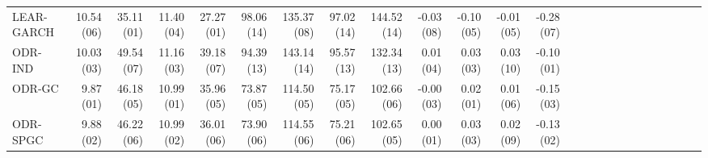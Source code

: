 \begin{tabular}{lrrrrrrrrrrrrrrrrrrrrrrrr}
LEAR-GARCH & {\cellcolor[HTML]{59A1CA}} \color[HTML]{F1F1F1} 10.54 (06) & {\cellcolor[HTML]{053061}} \color[HTML]{F1F1F1} 35.11 (01) & {\cellcolor[HTML]{266CAF}} \color[HTML]{F1F1F1} 11.40 (04) & {\cellcolor[HTML]{053061}} \color[HTML]{F1F1F1} 27.27 (01) & {\cellcolor[HTML]{BF3338}} \color[HTML]{F1F1F1} 98.06 (14) & {\cellcolor[HTML]{EDF2F5}} \color[HTML]{000000} 135.37 (08) & {\cellcolor[HTML]{D7634F}} \color[HTML]{F1F1F1} 97.02 (14) & {\cellcolor[HTML]{D05548}} \color[HTML]{F1F1F1} 144.52 (14) & {\cellcolor[HTML]{124984}} \color[HTML]{F1F1F1} -0.03 (08) & {\cellcolor[HTML]{246AAE}} \color[HTML]{F1F1F1} -0.10 (05) & {\cellcolor[HTML]{0A3B70}} \color[HTML]{F1F1F1} -0.01 (05) & {\cellcolor[HTML]{5FA5CD}} \color[HTML]{F1F1F1} -0.28 (07) \\
ODR-IND & {\cellcolor[HTML]{144E8A}} \color[HTML]{F1F1F1} 10.03 (03) & {\cellcolor[HTML]{CFE4EF}} \color[HTML]{000000} 49.54 (07) & {\cellcolor[HTML]{124984}} \color[HTML]{F1F1F1} 11.16 (03) & {\cellcolor[HTML]{D4E6F1}} \color[HTML]{000000} 39.18 (07) & {\cellcolor[HTML]{E27B62}} \color[HTML]{F1F1F1} 94.39 (13) & {\cellcolor[HTML]{FDD9C4}} \color[HTML]{000000} 143.14 (14) & {\cellcolor[HTML]{E37E64}} \color[HTML]{F1F1F1} 95.57 (13) & {\cellcolor[HTML]{FBCEB7}} \color[HTML]{000000} 132.34 (13) & {\cellcolor[HTML]{09386D}} \color[HTML]{F1F1F1} 0.01 (04) & {\cellcolor[HTML]{0A3B70}} \color[HTML]{F1F1F1} 0.03 (03) & {\cellcolor[HTML]{114781}} \color[HTML]{F1F1F1} 0.03 (10) & {\cellcolor[HTML]{053061}} \color[HTML]{F1F1F1} -0.10 (01) \\
ODR-GC & {\cellcolor[HTML]{053061}} \color[HTML]{F1F1F1} 9.87 (01) & {\cellcolor[HTML]{9BC9E0}} \color[HTML]{000000} 46.18 (05) & {\cellcolor[HTML]{053061}} \color[HTML]{F1F1F1} 10.99 (01) & {\cellcolor[HTML]{98C8E0}} \color[HTML]{000000} 35.96 (05) & {\cellcolor[HTML]{276EB0}} \color[HTML]{F1F1F1} 73.87 (05) & {\cellcolor[HTML]{1C5C9F}} \color[HTML]{F1F1F1} 114.50 (05) & {\cellcolor[HTML]{276EB0}} \color[HTML]{F1F1F1} 75.17 (05) & {\cellcolor[HTML]{195696}} \color[HTML]{F1F1F1} 102.66 (06) & {\cellcolor[HTML]{063264}} \color[HTML]{F1F1F1} -0.00 (03) & {\cellcolor[HTML]{053061}} \color[HTML]{F1F1F1} 0.02 (01) & {\cellcolor[HTML]{0A3B70}} \color[HTML]{F1F1F1} 0.01 (06) & {\cellcolor[HTML]{144E8A}} \color[HTML]{F1F1F1} -0.15 (03) \\
ODR-SPGC & {\cellcolor[HTML]{053061}} \color[HTML]{F1F1F1} 9.88 (02) & {\cellcolor[HTML]{9DCBE1}} \color[HTML]{000000} 46.22 (06) & {\cellcolor[HTML]{053061}} \color[HTML]{F1F1F1} 10.99 (02) & {\cellcolor[HTML]{98C8E0}} \color[HTML]{000000} 36.01 (06) & {\cellcolor[HTML]{276EB0}} \color[HTML]{F1F1F1} 73.90 (06) & {\cellcolor[HTML]{1C5C9F}} \color[HTML]{F1F1F1} 114.55 (06) & {\cellcolor[HTML]{276EB0}} \color[HTML]{F1F1F1} 75.21 (06) & {\cellcolor[HTML]{195696}} \color[HTML]{F1F1F1} 102.65 (05) & {\cellcolor[HTML]{053061}} \color[HTML]{F1F1F1} 0.00 (01) & {\cellcolor[HTML]{0A3B70}} \color[HTML]{F1F1F1} 0.03 (03) & {\cellcolor[HTML]{0D3F76}} \color[HTML]{F1F1F1} 0.02 (09) & {\cellcolor[HTML]{10457E}} \color[HTML]{F1F1F1} -0.13 (02) \\

\end{tabular}
